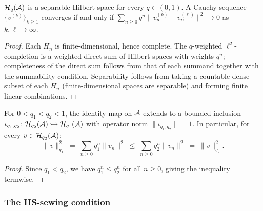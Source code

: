 \begin{lemma}
\label{lem:thqg-I-completeness}
$\mathcal{H}_q(\mathcal{A})$ is a separable Hilbert space for every $q \in (0,1)$. A Cauchy sequence $\{v^{(k)}\}_{k \geq 1}$ converges if and only if $\sum_{n \geq 0} q^n \|v^{(k)}_n - v^{(\ell)}_n\|^2 \to 0$ as $k, \ell \to \infty$.
\end{lemma}

\begin{proof}
Each $H_n$ is finite-dimensional, hence complete. The $q$-weighted $\ell^2$-completion is a weighted direct sum of Hilbert spaces with weights $q^n$; completeness of the direct sum follows from that of each summand together with the summability condition. Separability follows from taking a countable dense subset of each $H_n$ (finite-dimensional spaces are separable) and forming finite linear combinations.
\end{proof}

\begin{proposition}
\label{prop:thqg-I-inclusion-maps}
For $0 < q_1 < q_2 < 1$, the identity map on $\mathcal{A}$ extends to a bounded inclusion $\iota_{q_1,q_2} \colon \mathcal{H}_{q_2}(\mathcal{A}) \hookrightarrow \mathcal{H}_{q_1}(\mathcal{A})$ with operator norm $\|\iota_{q_1,q_2}\| = 1$. In particular, for every $v \in \mathcal{H}_{q_2}(\mathcal{A})$:
\begin{equation}\label{eq:thqg-I-inclusion}
\|v\|_{q_1}^2 \;=\; \sum_{n \geq 0} q_1^n \|v_n\|^2 \;\leq\; \sum_{n \geq 0} q_2^n \|v_n\|^2 \;=\; \|v\|_{q_2}^2.
\end{equation}
\end{proposition}

\begin{proof}
Since $q_1 < q_2$, we have $q_1^n \leq q_2^n$ for all $n \geq 0$, giving the inequality termwise.
\end{proof}

\subsubsection{The HS-sewing condition}

